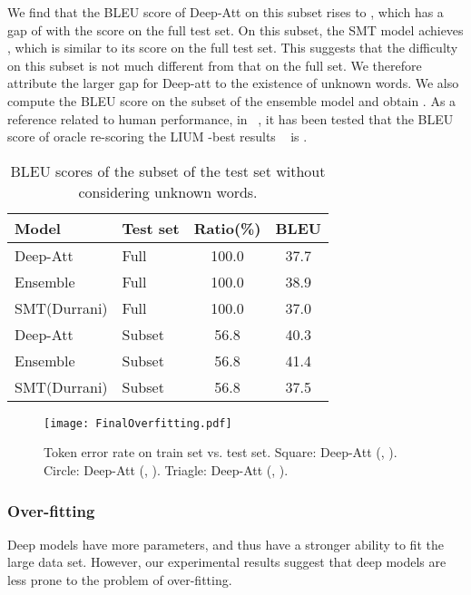 \documentclass[11pt,letterpaper]{article}
\begin{document}
We find that the BLEU score of Deep-Att on this subset rises to , which has a gap of  with the score  on the full test set.
On this subset, the SMT model achieves  ,  which is similar to its score  on the full test set. This suggests that the
\mbox{difficulty} on this subset is not much different from that on the full set. We therefore attribute the larger gap for Deep-att to the
existence of unknown words. We also compute the BLEU score on the subset of the ensemble model and obtain . As a reference related to
human performance, in  ~, it has been tested  that the BLEU score of oracle re-scoring the LIUM -best
results ~\cite{Schwenk-2014} is .
\begin{table}[!t]
\footnotesize
\begin{center}
\begin{tabular}{|l|l|c|c|}
\hline
  Model & Test set & Ratio(\%) &  BLEU \\
  \hline
  \hline
  Deep-Att & Full & 100.0  & 37.7 \\
  Ensemble & Full & 100.0  & 38.9 \\
  SMT(Durrani)     & Full & 100.0  & 37.0 \\
  \hline
  Deep-Att & Subset & 56.8  & 40.3 \\
  Ensemble & Subset & 56.8  & 41.4 \\
  SMT(Durrani)     & Subset & 56.8  & 37.5 \\
  \hline
\end{tabular}
\end{center}
\caption{\label{tab:Results-BLEU-SubsetWOunk} BLEU scores of the subset of the test set without considering unknown words. }
\end{table}
\begin{figure}[!t]
\begin{center}
\texttt{[image: FinalOverfitting.pdf]}
\caption{Token error rate on train set vs. test set. Square: Deep-Att (, ). Circle: Deep-Att (, ). Triagle:
Deep-Att (, ). }
\label{fig:NMT-Analysis-Overfitting}
\end{center}
\end{figure}



\subsubsection{Over-fitting}


Deep models have more parameters, and thus have a stronger ability to fit the large data set. However, our experimental results suggest that
deep models are less prone to the problem of over-fitting.
\end{document}
